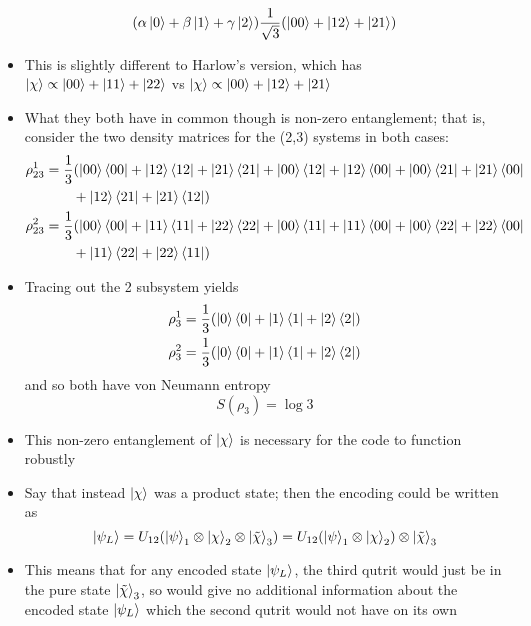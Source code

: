 \documentclass[12pt,a4paper]{article}
\numberwithin{equation}{section}
\newcommand{\ketbra}[2]{\ket{#1}\bra{#2}}
\newcommand{\ketbras}[1]{\ketbra{#1}{#1}}
\begin{document}
\begin{itemize}
		\begin{equation}
			(\alpha\ket{0}+\beta\ket{1}+\gamma\ket{2})\frac{1}{\sqrt{3}}(\ket{00}+\ket{12}+\ket{21})
		\end{equation}
		\item This is slightly different to Harlow's version, which has $\ket{\chi}\propto\ket{00}+\ket{11}+\ket{22}$ vs $\ket{\chi}\propto\ket{00}+\ket{12}+\ket{21}$
		\item What they both have in common though is non-zero entanglement; that is, consider the two density matrices for the (2,3) systems in both cases:
		\begin{equation}
			\begin{aligned}
				\rho^{1}_{23}&=\frac{1}{3}(\ketbras{00}+\ketbras{12}+\ketbras{21}+\ketbra{00}{12}+\ketbra{12}{00}+\ketbra{00}{21}+\ketbra{21}{00}\\&\qquad+ \ketbra{12}{21}+\ketbra{21}{12})\\
				\rho^{2}_{23}&=\frac{1}{3}(\ketbras{00}+\ketbras{11}+\ketbras{22}+\ketbra{00}{11}+\ketbra{11}{00}+\ketbra{00}{22}+\ketbra{22}{00}\\&\qquad+ \ketbra{11}{22}+\ketbra{22}{11})
			\end{aligned}
		\end{equation}
		\item Tracing out the 2 subsystem yields
		\begin{equation}
			\begin{aligned}
				\rho_{3}^{1}&=\frac{1}{3}(\ketbras{0}+\ketbras{1}+\ketbras{2})\\
				\rho_{3}^{2}&=\frac{1}{3}(\ketbras{0}+\ketbras{1}+\ketbras{2})
			\end{aligned}
		\end{equation}
		and so both have von Neumann entropy
		\begin{equation}
			S(\rho_{3})=\log 3
		\end{equation}
		\item This non-zero entanglement of $\ket{\chi}$ is necessary for the code to function robustly
		\item Say that instead $\ket{\chi}$ was a product state; then the encoding could be written as
		\begin{equation}
			\ket{\psi_{L}}=U_{12}(\ket{\psi}_{1}\otimes\ket{\chi}_{2}\otimes\ket{\tilde{\chi}}_{3})=U_{12}(\ket{\psi}_{1}\otimes\ket{\chi}_{2})\otimes\ket{\tilde{\chi}}_{3}
		\end{equation}
		\item This means that for any encoded state $\ket{\psi_{L}}$, the third qutrit would just be in the pure state $\ket{\tilde{\chi}}_{3}$, so would give no additional information about the encoded state $\ket{\psi_{L}}$ which the second qutrit would not have on its own
	\end{itemize}
\end{document}
